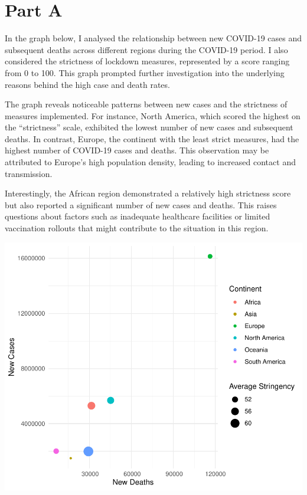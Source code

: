 \documentclass[11pt,preprint, authoryear]{elsarticle}
\numberwithin{equation}{section}
\numberwithin{figure}{section}
\numberwithin{table}{section}
\begin{document}
\hypertarget{part-a}{%
\section{Part A}\label{part-a}}

In the graph below, I analysed the relationship between new COVID-19
cases and subsequent deaths across different regions during the COVID-19
period. I also considered the strictness of lockdown measures,
represented by a score ranging from 0 to 100. This graph prompted
further investigation into the underlying reasons behind the high case
and death rates.

The graph reveals noticeable patterns between new cases and the
strictness of measures implemented. For instance, North America, which
scored the highest on the ``strictness'' scale, exhibited the lowest
number of new cases and subsequent deaths. In contrast, Europe, the
continent with the least strict measures, had the highest number of
COVID-19 cases and deaths. This observation may be attributed to
Europe's high population density, leading to increased contact and
transmission.

Interestingly, the African region demonstrated a relatively high
strictness score but also reported a significant number of new cases and
deaths. This raises questions about factors such as inadequate
healthcare facilities or limited vaccination rollouts that might
contribute to the situation in this region.

\includegraphics{Question1_files/figure-latex/unnamed-chunk-1-1.pdf}
\end{document}
